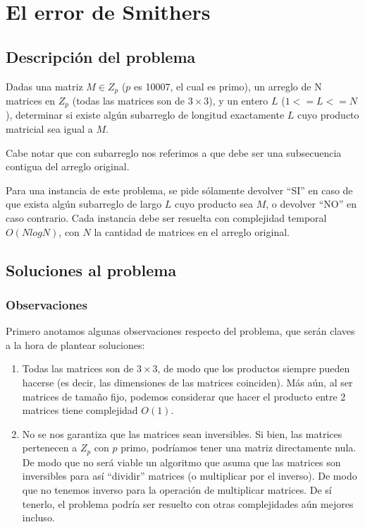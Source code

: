 \newpage{}
\section{El error de Smithers}
\subsection{Descripción del problema}
Dadas una matriz $M\in Z_p$ ($p$ es 10007, el cual es primo), un arreglo 
de N matrices en $Z_p$ (todas las matrices son de $3 \times 3$), 
y un entero $L$ ($1 <= L <= N$), determinar si existe algún subarreglo 
de longitud exactamente $L$ cuyo producto matricial 
sea igual a $M$. 

Cabe notar que con subarreglo nos referimos a que debe ser una 
subsecuencia contigua del arreglo original. 

Para una instancia de este problema, se pide sólamente devolver ``SI'' en 
caso de que exista algún subarreglo de largo $L$ cuyo producto sea $M$, o devolver 
``NO'' en caso contrario. Cada instancia debe ser resuelta con complejidad temporal 
$O(N log N)$, con $N$ 
la cantidad de matrices en el arreglo original. 

\subsection{Soluciones al problema}
\subsubsection{Observaciones}

Primero anotamos algunas observaciones respecto del problema, que serán claves a la
hora de plantear soluciones: 
\begin{enumerate}
    \item Todas las matrices son de $3 \times 3$, de modo que los productos siempre pueden 
    hacerse (es decir, las dimensiones de las matrices coinciden). Más aún, al ser matrices 
    de tamaño fijo, podemos considerar que hacer el producto entre 2 matrices tiene 
    complejidad $O(1)$. 
    \item No se nos garantiza que las matrices sean inversibles. Si bien, las matrices 
    pertenecen a $Z_p$ con $p$ primo, podríamos tener una matriz directamente nula. 
    De modo que no será viable un algoritmo que asuma que las matrices son inversibles para 
    así ``dividir'' matrices (o multiplicar por el inverso). De modo que no tenemos inverso para la 
    operación de multiplicar matrices. De sí tenerlo, el problema podría ser resuelto con 
    otras complejidades aún mejores incluso. 
\end{enumerate}

